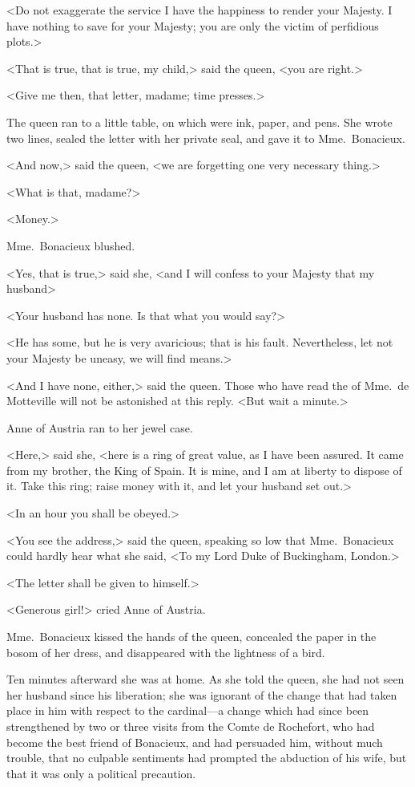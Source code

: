 <Do not exaggerate the service I have the happiness to render your Majesty. I have nothing to save for your Majesty; you are only the victim of perfidious plots.> 

<That is true, that is true, my child,> said the queen, <you are right.> 

<Give me then, that letter, madame; time presses.> 

The queen ran to a little table, on which were ink, paper, and pens. She wrote two lines, sealed the letter with her private seal, and gave it to Mme.~Bonacieux. 

<And now,> said the queen, <we are forgetting one very necessary thing.> 

<What is that, madame?> 

<Money.> 

Mme.~Bonacieux blushed. 

<Yes, that is true,> said she, <and I will confess to your Majesty that my husband\longdash> 

<Your husband has none. Is that what you would say?> 

<He has some, but he is very avaricious; that is his fault. Nevertheless, let not your Majesty be uneasy, we will find means.> 

<And I have none, either,> said the queen. Those who have read the  of Mme.~de Motteville will not be astonished at this reply. <But wait a minute.> 

Anne of Austria ran to her jewel case. 

<Here,> said she, <here is a ring of great value, as I have been assured. It came from my brother, the King of Spain. It is mine, and I am at liberty to dispose of it. Take this ring; raise money with it, and let your husband set out.> 

<In an hour you shall be obeyed.> 

<You see the address,> said the queen, speaking so low that Mme.~Bonacieux could hardly hear what she said, <To my Lord Duke of Buckingham, London.> 

<The letter shall be given to himself.> 

<Generous girl!> cried Anne of Austria. 

Mme.~Bonacieux kissed the hands of the queen, concealed the paper in the bosom of her dress, and disappeared with the lightness of a bird. 

Ten minutes afterward she was at home. As she told the queen, she had not seen her husband since his liberation; she was ignorant of the change that had taken place in him with respect to the cardinal—a change which had since been strengthened by two or three visits from the Comte de Rochefort, who had become the best friend of Bonacieux, and had persuaded him, without much trouble, that no culpable sentiments had prompted the abduction of his wife, but that it was only a political precaution. 

